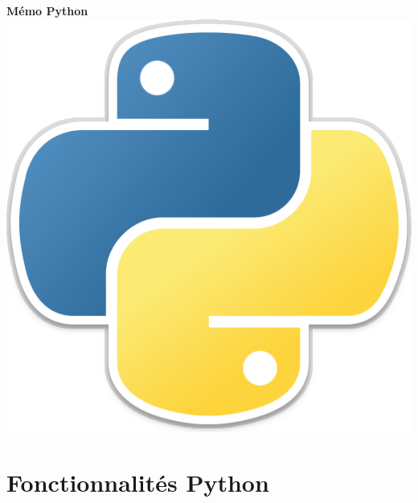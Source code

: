 \documentclass[a4paper, 10pt]{article}
\begin{document}
\begin{center}
        {\Huge{\sc\bfseries{Mémo Python}}}\\[20pt]
        \includegraphics[scale=0.1]{python.png}
        \vspace{20pt}
\end{center}
\tableofcontents
\hypersetup{linkcolor=blue}

\part{Fonctionnalités Python}
\end{document}
